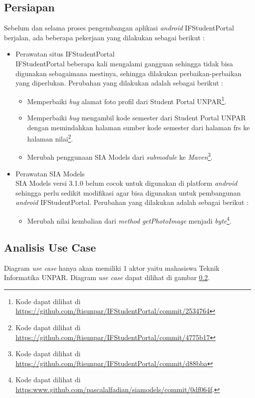 \subsection{Persiapan}
Sebelum dan selama proses pengembangan aplikasi \textit{android} IFStudentPortal berjalan, ada beberapa pekerjaan yang dilakukan sebagai berikut :
\begin{itemize}
    \item Perawatan situs IFStudentPortal\\
    IFStudentPortal beberapa kali mengalami gangguan sehingga tidak bisa digunakan sebagaimana mestinya, sehingga dilakukan perbaikan-perbaikan yang diperlukan. Perubahan yang dilakukan adalah sebagai berikut :
    \begin{itemize}
        \item Memperbaiki \textit{bug} alamat foto profil dari Student Portal UNPAR\footnote{Kode dapat dilihat di \url{https://github.com/ftisunpar/IFStudentPortal/commit/2534764}}.
        \item Memperbaiki \textit{bug} mengambil kode semester dari Student Portal UNPAR dengan memindahkan halaman sumber kode semester dari halaman frs ke halaman nilai\footnote{Kode dapat dilihat di \url{https://github.com/ftisunpar/IFStudentPortal/commit/4775b17}}.
        \item Merubah penggunaan SIA Models dari \textit{submodule} ke \textit{Maven}\footnote{Kode dapat dilihat di \url{https://github.com/ftisunpar/IFStudentPortal/commit/d88bba}}.
    \end{itemize}
    \item Perawatan SIA Models\\
    SIA Models versi 3.1.0 belum cocok untuk digunakan di platform \textit{android} sehingga perlu sedikit modifikasi agar bisa digunakan untuk pembangunan \textit{android} IFStudentPortal. Perubahan yang dilakukan adalah sebagai berikut :
    \begin{itemize}
        \item Merubah nilai kembalian dari \textit{method getPhotoImage} menjadi \textit{byte}\footnote{Kode dapat dilihat di \url{https:www.github.com/pascalalfadian/siamodels/commit/0df064f}.}.
    \end{itemize}
\end{itemize}

\subsection{Analisis Use Case}
Diagram \textit{use case} hanya akan memiliki 1 aktor yaitu mahasiswa Teknik Informatika UNPAR. Diagram \textit{use case} dapat dilihat di gambar \ref{}. 


